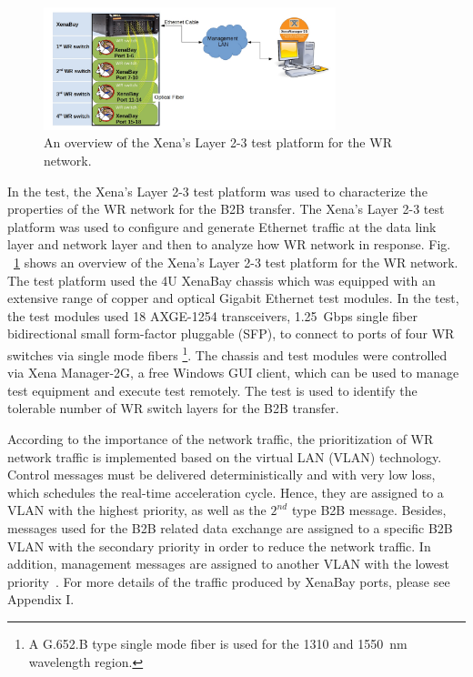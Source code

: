 \begin{figure}[!htb]
   \centering   
   \includegraphics*[width=85mm]{network_B2B2.jpg}
   \caption{An overview of the Xena's Layer 2-3 test platform for the WR network.}
   \label{network_B2B2}
\end{figure}
In the test, the Xena's Layer 2-3 test platform was used to characterize the properties of the WR network for the B2B transfer. The Xena's Layer 2-3 test platform was used to configure and generate Ethernet traffic at the data link layer and network layer and then to analyze how WR network in response. Fig. ~\ref{network_B2B2} shows an overview of the Xena's Layer 2-3 test platform for the WR network. The test platform used the 4U XenaBay chassis which was equipped with an extensive range of copper and optical Gigabit Ethernet test modules. In the test, the test modules used 18 AXGE-1254 transceivers, \SI{1.25}{Gbps} single fiber bidirectional small form-factor pluggable (SFP), to connect to ports of four WR switches via single mode fibers \footnote{A G.652.B type single mode fiber is used for the 1310 and \SI{1550}{nm} wavelength region.}. The chassis and test modules were controlled via Xena Manager-2G, a free Windows GUI client, which can be used to manage test equipment and execute test remotely. The test is used to identify the tolerable number of WR switch layers for the B2B transfer. 

According to the importance of the network traffic, the prioritization of WR network traffic is implemented based on the virtual LAN (VLAN) technology. Control messages must be delivered deterministically and with very low loss, which schedules the real-time acceleration cycle. Hence, they are assigned to a VLAN with the highest priority, as well as the $2^\mathit{nd}$ type B2B message. Besides, messages used for the B2B related data exchange are assigned to a specific B2B VLAN with the secondary priority in order to reduce the network traffic. In addition, management messages are assigned to another VLAN with the lowest priority~\cite{prados_testing_2016}. For more details of the traffic produced by XenaBay ports, please see Appendix I.


